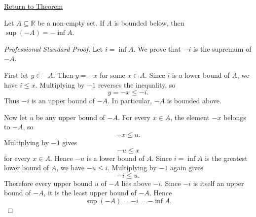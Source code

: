 \newpage
{}
\label{prf:negation-exchange-sup-inf}

\begin{remark*}[Return]
\hyperref[thm:negation-exchange-sup-inf]{Return to Theorem}
\end{remark*}

\begin{theorem*}
Let $A \subseteq \mathbb{R}$ be a non-empty set. If $A$ is bounded below, then $\sup(-A) = -\inf A$.
\end{theorem*}

\begin{proof}[Professional Standard Proof]
\LRAProofBodyStart
Let \(i=\inf A\). We prove that \(-i\) is the supremum of \(-A\).

First let \(y\in -A\). Then \(y=-x\) for some \(x\in A\). Since \(i\) is a
lower bound of \(A\), we have \(i\le x\). Multiplying by \(-1\) reverses the
inequality, so
\[
y=-x\le -i.
\]
Thus \(-i\) is an upper bound of \(-A\). In particular, \(-A\) is bounded
above.

Now let \(u\) be any upper bound of \(-A\). For every \(x\in A\), the element
\(-x\) belongs to \(-A\), so
\[
-x\le u.
\]
Multiplying by \(-1\) gives
\[
-u\le x
\]
for every \(x\in A\). Hence \(-u\) is a lower bound of \(A\). Since \(i=\inf A\)
is the greatest lower bound of \(A\), we have \(-u\le i\). Multiplying by
\(-1\) again gives
\[
-i\le u.
\]
Therefore every upper bound \(u\) of \(-A\) lies above \(-i\). Since \(-i\) is
itself an upper bound of \(-A\), it is the least upper bound of \(-A\). Hence
\[
\sup(-A)=-i=-\inf A.
\]
\end{proof}

